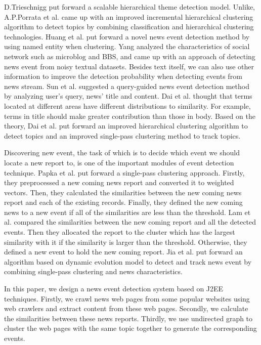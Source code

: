 \documentclass[conference]{IEEEtran}
\begin{document}
D.Trieschnigg\cite{2005-Trieschnigg-p55-62} put forward a scalable hierarchical theme detection model. Unlike\cite{2007-Pons-Porrata-p752-768}, A.P.Porrata et al. came up with an improved incremental hierarchical clustering algorithm to detect topics by combining classification and hierarchical clustering technologies. Huang et al. \cite{2011-Huang-p280-284} put forward a novel news event detection method by using named entity when clustering. Yang \cite{2010-Yang-p372-374} analyzed the characteristics of social network such as microblog and BBS, and came up with an approach of detecting news event from noisy textual datasets. Besides text itself, we can also use other information to improve the detection probability when detecting events from news stream. Sun et al. \cite{2011-Sun-p834-839} suggested a query-guided news event detection method by analyzing user’s query, news’ title and content. Dai et al. \cite{2010-Dai-p3341-3346} thought that terms located at different areas have different distributions to similarity. For example, terms in title should make greater contribution than those in body. Based on the theory, Dai et al. put forward an improved hierarchical clustering algorithm to detect topics and an improved single-pass clustering method to track topics.

Discovering new event, the task of which is to decide which event we should locate a new report to, is one of the important modules of event detection technique. Papka et al.\cite{1998-Papka-p-} put forward a single-pass clustering approach. Firstly, they preprocessed a new coming news report and converted it to weighted vectors. Then, they calculated the similarities between the new coming news report and each of the existing records. Finally, they defined the new coming news to a new event if all of the similarities are less than the threshold. Lam et al. \cite{2001-Lam-p525-546} compared the similarities between the new coming report and all the detected events. Then they allocated the report to the cluster which has the largest similarity with it if the similarity is larger than the threshold. Otherwise, they defined a new event to hold the new coming report. Jia et al. \cite{2004-JIA-p32-32} put forward an algorithm based on dynamic evolution model to detect and track news event by combining single-pass clustering and news characteristics. 

In this paper, we design a news event detection system based on J2EE techniques. Firstly, we crawl news web pages from some popular websites using web crawlers and extract content from these web pages. Secondly, we calculate the similarities between these news reports. Thirdly, we use undirected graph to cluster the web pages with the same topic together to generate the corresponding events.
\end{document}
